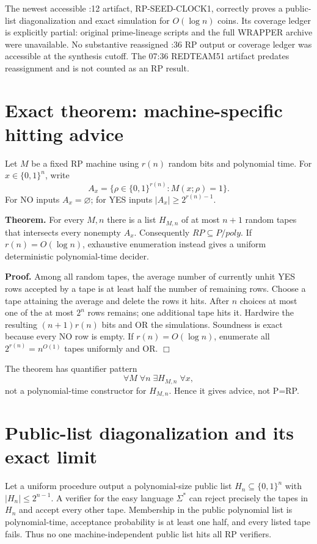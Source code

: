 \documentclass[11pt]{article}
\begin{document}
The newest accessible :12 artifact, RP-SEED-CLOCK1, correctly proves a public-
list diagonalization and exact simulation for $O(\log n)$ coins.  Its coverage
ledger is explicitly partial: original prime-lineage scripts and the full
WRAPPER archive were unavailable.  No substantive reassigned :36 RP output or
coverage ledger was accessible at the synthesis cutoff.  The 07:36 REDTEAM51
artifact predates reassignment and is not counted as an RP result.

\section*{Exact theorem: machine-specific hitting advice}
Let $M$ be a fixed RP machine using $r(n)$ random bits and polynomial time.
For $x\in\{0,1\}^n$, write
\[
 A_x=\{\rho\in\{0,1\}^{r(n)}:M(x;\rho)=1\}.
\]
For NO inputs $A_x=\varnothing$; for YES inputs
$|A_x|\ge 2^{r(n)-1}$.

\textbf{Theorem.} For every $M,n$ there is a list $H_{M,n}$ of at most $n+1$
random tapes that intersects every nonempty $A_x$.  Consequently
$RP\subseteq P/poly$.  If $r(n)=O(\log n)$, exhaustive enumeration instead
gives a uniform deterministic polynomial-time decider.

\textbf{Proof.}  Among all random tapes, the average number of currently
unhit YES rows accepted by a tape is at least half the number of remaining
rows.  Choose a tape attaining the average and delete the rows it hits.
After $n$ choices at most one of the at most $2^n$ rows remains; one additional
tape hits it.  Hardwire the resulting $(n+1)r(n)$ bits and OR the simulations.
Soundness is exact because every NO row is empty.  If $r(n)=O(\log n)$,
enumerate all $2^{r(n)}=n^{O(1)}$ tapes uniformly and OR. \hfill$\Box$

The theorem has quantifier pattern
\[
 \forall M\;\forall n\;\exists H_{M,n}\;\forall x,
\]
not a polynomial-time constructor for $H_{M,n}$.  Hence it gives advice, not
P=RP.

\section*{Public-list diagonalization and its exact limit}
Let a uniform procedure output a polynomial-size public list $H_n\subseteq
\{0,1\}^n$ with $|H_n|\le 2^{n-1}$.  A verifier for the easy language
$\Sigma^*$ can reject precisely the tapes in $H_n$ and accept every other
tape.  Membership in the public polynomial list is polynomial-time, acceptance
probability is at least one half, and every listed tape fails.  Thus no one
machine-independent public list hits all RP verifiers.
\end{document}
